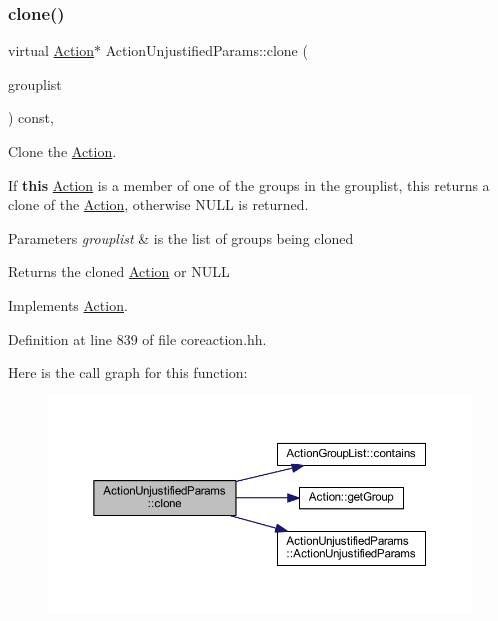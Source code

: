 \subsubsection{\texorpdfstring{clone()}{clone()}}
{\footnotesize\ttfamily virtual \mbox{\hyperlink{class_action}{Action}}$\ast$ Action\+Unjustified\+Params\+::clone (\begin{DoxyParamCaption}\item[{const \mbox{\hyperlink{class_action_group_list}{Action\+Group\+List}} \&}]{grouplist }\end{DoxyParamCaption}) const\hspace{0.3cm}{\ttfamily [inline]}, {\ttfamily [virtual]}}



Clone the \mbox{\hyperlink{class_action}{Action}}. 

If {\bfseries{this}} \mbox{\hyperlink{class_action}{Action}} is a member of one of the groups in the grouplist, this returns a clone of the \mbox{\hyperlink{class_action}{Action}}, otherwise N\+U\+LL is returned. 
\begin{DoxyParams}{Parameters}
{\em grouplist} & is the list of groups being cloned \\
\hline
\end{DoxyParams}
\begin{DoxyReturn}{Returns}
the cloned \mbox{\hyperlink{class_action}{Action}} or N\+U\+LL 
\end{DoxyReturn}


Implements \mbox{\hyperlink{class_action_af8242e41d09e5df52f97df9e65cc626f}{Action}}.



Definition at line 839 of file coreaction.\+hh.

Here is the call graph for this function\+:
\nopagebreak
\begin{figure}[H]
\begin{center}
\leavevmode
\includegraphics[width=350pt]{class_action_unjustified_params_a07403536c15bc35659c34d1dec3b2c11_cgraph}
\end{center}
\end{figure}



